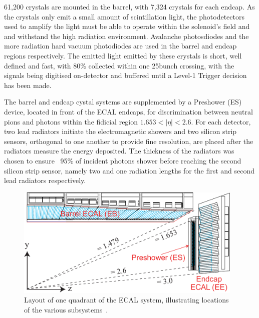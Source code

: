 61,200 crystals are mounted in the barrel, with 7,324 crystals for each endcap.
As the crystals only emit a small amount of scintillation light, the photodetectors used to amplify the light must be able to operate within the solenoid's field and and withstand the high radiation environment.
Avalanche photosdiodes and the more radiation hard vacuum photodiodes are used in the barrel and endcap regions respectively.
The emitted light emitted by these crystals is short, well defined and fast, with 80\% collected within one 25\ns bunch crossing, with the signals being digitised on-detector and buffered until a Level-1 Trigger decision has been made.

The barrel and endcap cystal systems are supplemented by a Preshower (ES)~\cite{Loos:539819} device, located in front of the ECAL endcaps, for discrimination between neutral pions and photons within the fidicial region $1.653 < |\eta| < 2.6$.
For each detector, two lead radiators initiate the electromagnetic showers and two silicon strip sensors, orthogonal to one another to provide fine resolution, are placed after the radiators measure the energy deposited.
The thickness of the radiators was chosen to ensure ~95\% of incident photons shower before reaching the second silicon strip sensor, namely two and one radiation lengths for the first and second lead radiators respectively.

\begin{figure}[htbp]
\begin{center}
\includegraphics[width=0.97\textwidth]{figs/cms/ECAL_Transverse_section.pdf}
\caption{Layout of one quadrant of the ECAL system, illustrating locations of the various subsystems~\cite{Bayatian:2006nff}.}
\label{fig:ecal}
\end{center}
\end{figure}


